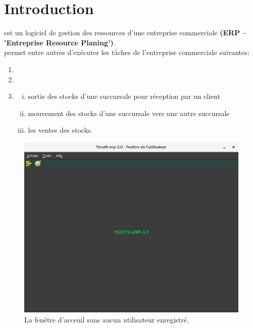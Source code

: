 \chapter{Introduction}\label{chap:introduction}

\yeroth est un logiciel de gestion des ressources
d'une entreprise commerciale \textbf{(ERP -- 'Entreprise Resource
Planing')}.\\

\yeroth permet entre autres d'ex\'ecuter les t\^aches de l'entreprise
commerciale suivantes:
\begin{enumerate}[1)]
	\item {}	
	\item {}
	\item {}
	\begin{enumerate}[(i)]
		\item {} sortie
			des stocks d'une succursale pour
			r\'eception par un client
		\item {} 
			mouvement des stocks d'une succursale
			vers une autre succursale			
		\item les ventes des stocks.\\
	\end{enumerate}
\end{enumerate} 


\begin{figure}[!htbp]
\centering
\includegraphics[scale=0.63]{images/yeren-fenetre-principale.png}
\caption{La fen\^etre d'acceuil sans aucun utilisateur enregistr\'e.}
\label{fig:fenetre-principale-utilisateur-non-enregistre}
\end{figure}

